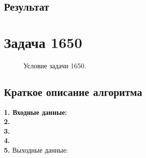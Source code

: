 \documentclass[a5paper, 10pt]{article}
\theoremstyle{definition}
\theoremstyle{plain}
\theoremstyle{remark}
\begin{document}
\subsection{Результат}







\newpage
\section{Задача 1650}

\begin{figure}[h!]
\caption{Условие задачи 1650.}
\end{figure}

\subsection{Краткое описание алгоритма}
\textbf{1. Входные данные:} \\
\textbf{2.}  \\
\textbf{3.}  \\
\textbf{4.}  \\
\textbf{5.} Выходные данные: 
\end{document}
